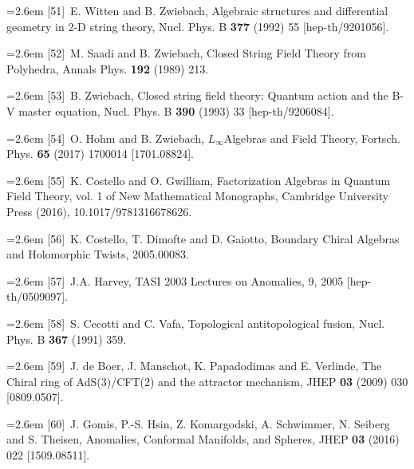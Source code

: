 \par\noindent\hangindent=2.6em [51]~E. Witten and B. Zwiebach, Algebraic structures and differential geometry in 2-D string theory, Nucl. Phys. B \textbf{377} (1992) 55 [hep-th/9201056].

\par\noindent\hangindent=2.6em [52]~M. Saadi and B. Zwiebach, Closed String Field Theory from Polyhedra, Annals Phys. \textbf{192} (1989) 213.


\par\noindent\hangindent=2.6em [53]~B. Zwiebach, Closed string field theory: Quantum action and the B-V master equation, Nucl. Phys. B \textbf{390} (1993) 33 [hep-th/9206084].

\par\noindent\hangindent=2.6em [54]~O. Hohm and B. Zwiebach, $L_\infty$Algebras and Field Theory, Fortsch. Phys. \textbf{65} (2017) 1700014 [1701.08824].

\par\noindent\hangindent=2.6em [55]~K. Costello and O. Gwilliam, Factorization Algebras in Quantum Field Theory, vol. 1 of New Mathematical Monographs, Cambridge University Press (2016), 10.1017/9781316678626.

\par\noindent\hangindent=2.6em [56]~K. Costello, T. Dimofte and D. Gaiotto, Boundary Chiral Algebras and Holomorphic Twists, 2005.00083.

\par\noindent\hangindent=2.6em [57]~J.A. Harvey, TASI 2003 Lectures on Anomalies, 9, 2005 [hep-th/0509097].

\par\noindent\hangindent=2.6em [58]~S. Cecotti and C. Vafa, Topological antitopological fusion, Nucl. Phys. B \textbf{367} (1991) 359.

\par\noindent\hangindent=2.6em [59]~J. de Boer, J. Manschot, K. Papadodimas and E. Verlinde, The Chiral ring of AdS(3)/CFT(2) and the attractor mechanism, JHEP \textbf{03} (2009) 030 [0809.0507].

\par\noindent\hangindent=2.6em [60]~J. Gomis, P.-S. Hsin, Z. Komargodski, A. Schwimmer, N. Seiberg and S. Theisen, Anomalies, Conformal Manifolds, and Spheres, JHEP \textbf{03} (2016) 022 [1509.08511].

